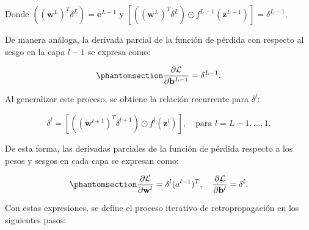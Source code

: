 \documentclass[
  us-letterpaper,
]{scrreprt}
\theoremstyle{plain}
\theoremstyle{definition}
\theoremstyle{plain}
\theoremstyle{definition}
\theoremstyle{remark}
\begin{document}
Donde \(((\mathbf w^L)^T \delta^L) = \mathbf e^{L-1}\) y
\([((\mathbf w^L)^T \delta^L)\odot f^{L-1}(\mathbf z^{L-1})] = \delta^{L-1}\).

De manera análoga, la derivada parcial de la función de pérdida con
respecto al sesgo en la capa \(l-1\) se expresa como:

\begin{equation}\phantomsection\label{eq-24}{\frac{\partial \mathcal L}{\partial \mathbf b^{L-1}} = \delta^{L-1}.}\end{equation}

Al generalizar este proceso, se obtiene la relación recurrente para
\(\delta^l\):

\[\delta^l = \left[((\mathbf w^{l+1})^T \delta^{l+1})\odot f^l(\mathbf z^l) \right], \quad \text{para } l = L-1, \ldots, 1.\]

De esta forma, las derivadas parciales de la función de pérdida respecto
a los pesos y sesgos en cada capa se expresan como:

\begin{equation}\phantomsection\label{eq-25}{\frac{\partial \mathcal L}{\partial \mathbf w^l} = \delta^l (a^{l-1})^T,\quad \frac{\partial \mathcal L}{\partial \mathbf b^l} = \delta^l.}\end{equation}

Con estas expresiones, se define el proceso iterativo de
retropropagación en los siguientes pasos:
\end{document}
